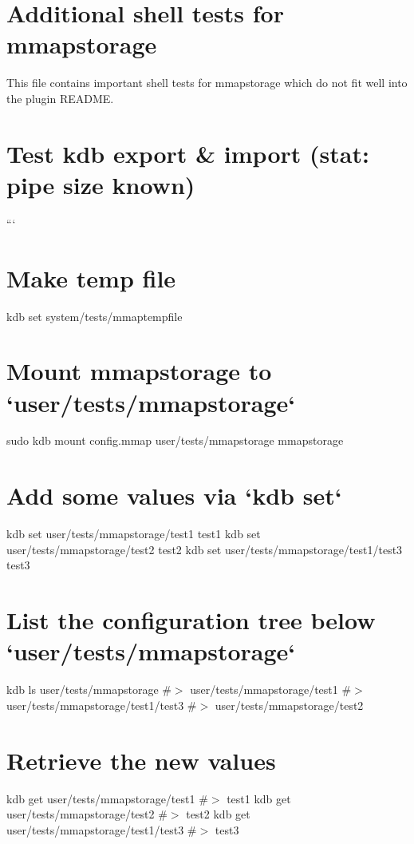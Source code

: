 \hypertarget{autotoc_md444_src_plugins_mmapstorage_shelltests_md}{}\section{Additional shell tests for mmapstorage}\label{autotoc_md444_src_plugins_mmapstorage_shelltests_md}
This file contains important shell tests for mmapstorage which do not fit well into the plugin R\+E\+A\+D\+ME.\hypertarget{autotoc_md444_autotoc_md445}{}\section{Test kdb export \& import (stat\+: pipe size known)}\label{autotoc_md444_autotoc_md445}
``` \hypertarget{autotoc_md444_autotoc_md446}{}\section{Make temp file}\label{autotoc_md444_autotoc_md446}
kdb set system/tests/mmaptempfile \hypertarget{autotoc_md444_autotoc_md447}{}\section{Mount mmapstorage to `user/tests/mmapstorage`}\label{autotoc_md444_autotoc_md447}
sudo kdb mount config.\+mmap user/tests/mmapstorage mmapstorage\hypertarget{autotoc_md444_autotoc_md448}{}\section{Add some values via `kdb set`}\label{autotoc_md444_autotoc_md448}
kdb set user/tests/mmapstorage/test1 test1 kdb set user/tests/mmapstorage/test2 test2 kdb set user/tests/mmapstorage/test1/test3 test3\hypertarget{autotoc_md444_autotoc_md449}{}\section{List the configuration tree below `user/tests/mmapstorage`}\label{autotoc_md444_autotoc_md449}
kdb ls user/tests/mmapstorage \#$>$ user/tests/mmapstorage/test1 \#$>$ user/tests/mmapstorage/test1/test3 \#$>$ user/tests/mmapstorage/test2\hypertarget{autotoc_md444_autotoc_md450}{}\section{Retrieve the new values}\label{autotoc_md444_autotoc_md450}
kdb get user/tests/mmapstorage/test1 \#$>$ test1 kdb get user/tests/mmapstorage/test2 \#$>$ test2 kdb get user/tests/mmapstorage/test1/test3 \#$>$ test3

